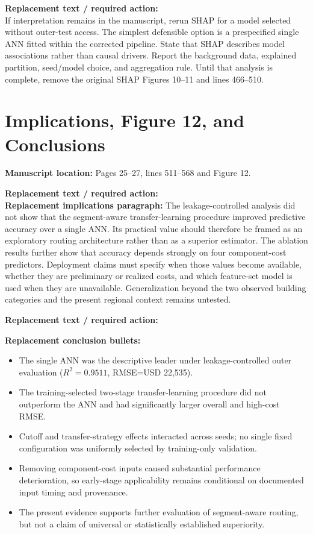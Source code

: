\documentclass[10pt]{article}
\newcommand{\loc}[1]{\textbf{Manuscript location:} #1}
\newcommand{\replacewith}[1]{\textbf{Replacement text / required action:}\\{\color{revisionblue}#1}}
\begin{document}
\replacewith{If interpretation remains in the manuscript, rerun SHAP for a model selected without outer-test access. The simplest defensible option is a prespecified single ANN fitted within the corrected pipeline. State that SHAP describes model associations rather than causal drivers. Report the background data, explained partition, seed/model choice, and aggregation rule. Until that analysis is complete, remove the original SHAP Figures 10--11 and lines 466--510.}

\section{Implications, Figure 12, and Conclusions}

\loc{Pages 25--27, lines 511--568 and Figure 12.}

\replacewith{\textbf{Replacement implications paragraph:} The leakage-controlled analysis did not show that the segment-aware transfer-learning procedure improved predictive accuracy over a single ANN. Its practical value should therefore be framed as an exploratory routing architecture rather than as a superior estimator. The ablation results further show that accuracy depends strongly on four component-cost predictors. Deployment claims must specify when those values become available, whether they are preliminary or realized costs, and which feature-set model is used when they are unavailable. Generalization beyond the two observed building categories and the present regional context remains untested.}

\replacewith{\textbf{Replacement conclusion bullets:}
\begin{itemize}[leftmargin=18pt,itemsep=2pt]
\item The single ANN was the descriptive leader under leakage-controlled outer evaluation ($R^2=0.9511$, RMSE=USD 22,535).
\item The training-selected two-stage transfer-learning procedure did not outperform the ANN and had significantly larger overall and high-cost RMSE.
\item Cutoff and transfer-strategy effects interacted across seeds; no single fixed configuration was uniformly selected by training-only validation.
\item Removing component-cost inputs caused substantial performance deterioration, so early-stage applicability remains conditional on documented input timing and provenance.
\item The present evidence supports further evaluation of segment-aware routing, but not a claim of universal or statistically established superiority.
\end{itemize}}
\end{document}
